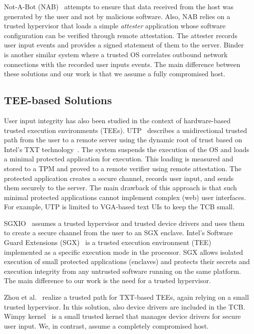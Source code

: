 Not-A-Bot (NAB)~\cite{nab} attempts to ensure that data received from the host was generated by the user and not by malicious software. Also, NAB relies on a trusted hypervisor that loads a simple \emph{attester} application whose software configuration can be verified through remote attestation. The attester records user input events and provides a signed statement of them to the server. Binder~\cite{binder} is another similar system where a trusted OS correlates outbound network connections with the recorded user inputs events. The main difference between these solutions and our work is that we assume a fully compromised host.


\subsection{TEE-based Solutions} 

User input integrity has also been studied in the context of hardware-based trusted execution environments (TEEs).  UTP~\cite{filyanov2011uni} describes a unidirectional trusted path from the user to a remote server using the dynamic root of trust based on Intel's TXT technology~\cite{mccune2008flicker}. The system suspends the execution of the OS and loads a minimal protected application for execution. This loading is measured and stored to a TPM and proved to a remote verifier using remote attestation. The protected application creates a secure channel, records user input, and sends them securely to the server. The main drawback of this approach is that such minimal protected applications cannot implement complex (web) user interfaces. For example, UTP is limited to VGA-based text UIs to keep the TCB small.

SGXIO~\cite{weiser2017sgxio} assumes a trusted hypervisor and trusted device drivers and uses them to create a secure channel from the user to an SGX enclave. Intel's Software Guard Extensions (SGX)~\cite{sgx} is a trusted execution environment (TEE) implemented as a specific execution mode in the processor. SGX allows isolated execution of small protected applications (enclaves) and protects their secrets and execution integrity from any untrusted software running on the same platform. The main difference to our work is the need for a trusted hypervisor.

Zhou et al.~\cite{zhou2012building} realize a trusted path for TXT-based TEEs, again relying on a small trusted hypervisor. In this solution, also device drivers are included in the TCB. Wimpy kernel~\cite{wimpyKernel} is a small trusted kernel that manages device drivers for secure user input. We, in contrast, assume a completely compromised host.


